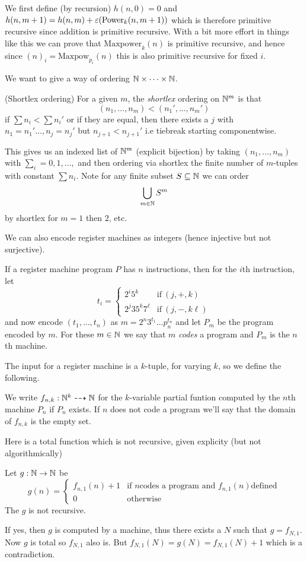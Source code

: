 \documentclass[tikx, border = 10pt]{article}
\begin{document}
We first define (by recursion) $ h(n,0) = 0 $ and $ h(n,m+1) = h(n,m) + \varepsilon(\mathrm{Power}_k(n,m+1)) $ which is therefore primitive recursive since addition is primitive recursive. With a bit more effort in things like this we can prove that $ \mathrm{Maxpower}_k(n) $ is primitive recursive, and hence since $ (n)_i = \mathrm{Maxpow}_{p_i}(n) $ this is also primitive recursive for fixed $ i $.
\par
We want to give a way of ordering $ \mathbb{N} \times \dots \times \mathbb{N} $.
\begin{definition}
	(Shortlex ordering) For a given $ m $, the \textit{shortlex} ordering on $ \mathbb{N}^m $ is that 
	\[
		(n_1,\dots, n_m) < (n_1',\dots, n_m')
	\]
	if $ \sum n_i <\sum n_i' $ or if they are equal, then there exists a $ j $ with $ n_1=n_1'\dots, n_j=n_j' $ but $ n_{j+1}<n_{j+1}' $ i.e tiebreak starting componentwise.
\end{definition}
This gives us an indexed list of $ \mathbb{N}^m $ (explicit bijection) by taking $ (n_1,\dots, n_m) $ with $ \sum_i =0,1,\dots, $ and then ordering via shortlex the finite number of $ m $-tuples with constant $ \sum n_i $. Note for any finite subset $ S\subseteq \mathbb{N} $ we can order
\[
	\bigcup_{m\in \mathbb{N}} S^m
\]
by shortlex for $ m=1 $ then $ 2 $, etc.\par
We can also encode register machines as integers (hence injective but not surjective).
\begin{definition}
  If a register machine program $ P $ has $ n $ instructions, then for the $ i $th instruction, let 
  \[
    t_i = \begin{cases}
    2^i5^k & \text{if}\ (j,+,k) \\
    2^j35^k7^\ell & \text{if}\ (j,-,k\ell)
    \end{cases}
  \]
  and now encode $ (t_1,\dots, t_n) $ as $ m = 2^n 3^{t_1}\dots p_n^{t_n} $ and let $ P_m $ be the program encoded by $ m $. For these $ m\in \mathbb{N} $ we say that $ m $ \textit{codes} a program and $ P_m $ is the $ n $th machine.
\end{definition}
The input for a register machine is a $ k $-tuple, for varying $ k $, so we define the following.
\begin{definition}
	We write $ f_{n,k}: \mathbb{N}^k \dashrightarrow \mathbb{N} $ for the $ k $-variable partial funtion computed by the $ n $th machine $ P_n $ if $ P_n $ exists. If $ n $ does not code a program we'll say that the domain of $ f_{n,k} $ is the empty set.
\end{definition}
Here is a total function which is not recursive, given explicity (but not algorithmically)
\begin{lemma}
	Let $ g: \mathbb{N} \to \mathbb{N} $ be 
	\[
	  g(n) = \begin{cases}
		  f_{n,1}(n) + 1 & \text{if } n \text{codes a program and } f_{n,1}(n) \text{defined} \\
		0 & \text{otherwise}
	  \end{cases}
	\]
	The $ g $ is not recursive.
\end{lemma}
\pf If yes, then $ g $ is computed by a machine, thus there exists a $ N $ such that $ g=f_{N,1} $. Now $ g $ is total so $ f_{N,1} $ also is. But $ f_{N,1}(N) = g(N) = f_{N,1}(N) + 1 $ which is a contradiction.
  
\end{document}
